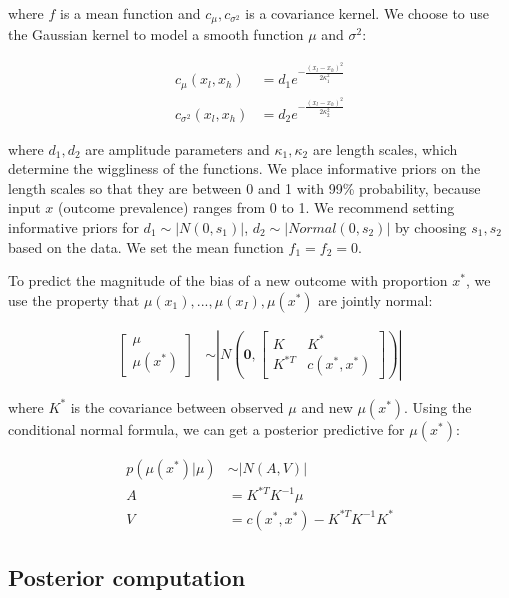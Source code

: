 \noindent where $f$ is a mean function and $c_\mu, c_{\sigma^2}$ is a covariance kernel. We choose to use the Gaussian kernel to model a smooth function $\mu$ and $\sigma^2$:

\begin{align}
    c_\mu(x_l, x_h) &= d_1 e^{- \frac{(x_l-x_h)^2}{2 \kappa_1^2}} \\
    c_{\sigma^2}(x_l, x_h) &= d_2 e^{- \frac{(x_l-x_h)^2}{2 \kappa_2^2}}
\end{align}

\noindent where $d_1, d_2$ are amplitude parameters and $\kappa_1, \kappa_2$ are length scales, which determine the wiggliness of the functions. We place informative priors on the length scales so that they are between 0 and 1 with 99\% probability, because input $x$ (outcome prevalence) ranges from 0 to 1. We recommend setting informative priors for $d_1 \sim |N(0, s_1)|$, $d_2 \sim |Normal(0, s_2)|$ by choosing $s_1, s_2$ based on the data. We set the mean function $f_1 = f_2 = 0$.

To predict the magnitude of the bias of a new outcome with proportion $x^\ast$, we use the property that $\mu(x_1),...,\mu(x_I), \mu(x^\ast)$ are jointly normal:

\begin{align}
    \begin{bmatrix}
    \mu \\
    \mu(x^\ast)
\end{bmatrix} &\sim |N(\boldsymbol{0},
\begin{bmatrix}
K & K^\ast\\
K^{\ast T} & c(x^\ast, x^\ast)
\end{bmatrix}
)|
\end{align}

where $K^\ast$ is the covariance between observed $\mu$ and new $\mu(x^\ast)$. Using the conditional normal formula, we can get a posterior predictive for $\mu(x^\ast)$:

\begin{align}
    p(\mu(x^\ast) | \mu) &\sim |N(A, V)| \\
    A &= K^{\ast T} K^{-1} \mu \\
    V &= c(x^\ast, x^\ast) - K^{\ast T} K^{-1} K^\ast
\end{align}

\subsection{Posterior computation}

